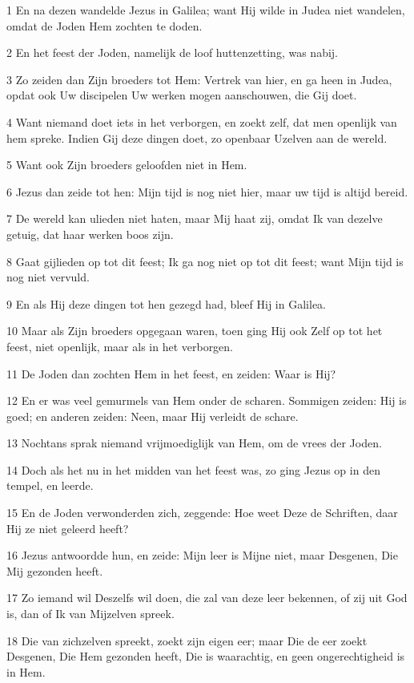 \par 1 En na dezen wandelde Jezus in Galilea; want Hij wilde in Judea niet wandelen, omdat de Joden Hem zochten te doden.
\par 2 En het feest der Joden, namelijk de loof huttenzetting, was nabij.
\par 3 Zo zeiden dan Zijn broeders tot Hem: Vertrek van hier, en ga heen in Judea, opdat ook Uw discipelen Uw werken mogen aanschouwen, die Gij doet.
\par 4 Want niemand doet iets in het verborgen, en zoekt zelf, dat men openlijk van hem spreke. Indien Gij deze dingen doet, zo openbaar Uzelven aan de wereld.
\par 5 Want ook Zijn broeders geloofden niet in Hem.
\par 6 Jezus dan zeide tot hen: Mijn tijd is nog niet hier, maar uw tijd is altijd bereid.
\par 7 De wereld kan ulieden niet haten, maar Mij haat zij, omdat Ik van dezelve getuig, dat haar werken boos zijn.
\par 8 Gaat gijlieden op tot dit feest; Ik ga nog niet op tot dit feest; want Mijn tijd is nog niet vervuld.
\par 9 En als Hij deze dingen tot hen gezegd had, bleef Hij in Galilea.
\par 10 Maar als Zijn broeders opgegaan waren, toen ging Hij ook Zelf op tot het feest, niet openlijk, maar als in het verborgen.
\par 11 De Joden dan zochten Hem in het feest, en zeiden: Waar is Hij?
\par 12 En er was veel gemurmels van Hem onder de scharen. Sommigen zeiden: Hij is goed; en anderen zeiden: Neen, maar Hij verleidt de schare.
\par 13 Nochtans sprak niemand vrijmoediglijk van Hem, om de vrees der Joden.
\par 14 Doch als het nu in het midden van het feest was, zo ging Jezus op in den tempel, en leerde.
\par 15 En de Joden verwonderden zich, zeggende: Hoe weet Deze de Schriften, daar Hij ze niet geleerd heeft?
\par 16 Jezus antwoordde hun, en zeide: Mijn leer is Mijne niet, maar Desgenen, Die Mij gezonden heeft.
\par 17 Zo iemand wil Deszelfs wil doen, die zal van deze leer bekennen, of zij uit God is, dan of Ik van Mijzelven spreek.
\par 18 Die van zichzelven spreekt, zoekt zijn eigen eer; maar Die de eer zoekt Desgenen, Die Hem gezonden heeft, Die is waarachtig, en geen ongerechtigheid is in Hem.
